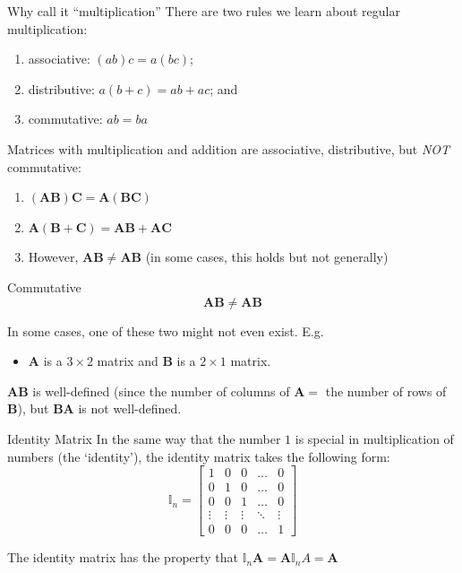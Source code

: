 \documentclass[aspectratio=169,t,11pt,table]{beamer}
\begin{document}
\begin{frame}{Why call it ``multiplication''}
  There are two rules we learn about regular multiplication:
  \begin{enumerate}
    \item associative: $(ab)c = a(bc)$;
    \item distributive: $a (b + c) = ab + ac$; and 
    \item commutative: $ab = ba$
  \end{enumerate} 

  \pause
  \bigskip
  Matrices with multiplication and addition are associative, distributive, but \emph{NOT} commutative:
  \begin{enumerate}
    \item $(\bm{A} \bm{B}) \bm{C} = \bm{A} (\bm{B} \bm{C})$ 
    
    \item $\bm{A} (\bm{B} + \bm{C}) = \bm{A} \bm{B} + \bm{A} \bm{C}$
    
    \item However, $\bm{A} \bm{B} \neq \bm{A} \bm{B}$ (in some cases, this holds but not generally)
  \end{enumerate}
\end{frame}

\begin{frame}{Commutative}
  \vspace*{-\bigskipamount}
  $$\bm{A} \bm{B} \neq \bm{A} \bm{B}$$

  \bigskip
  In some cases, one of these two might not even exist. E.g.
  \begin{itemize}
    \item $\bm{A}$ is a $3 \times 2$ matrix and $\bm{B}$ is a $2 \times 1$ matrix.
  \end{itemize}

  $\bm{A} \bm{B}$ is well-defined (since the number of columns of $\bm{A} =$ the number of rows of $\bm{B}$), but $\bm{B} \bm{A}$ is not well-defined.
\end{frame}

\begin{frame}{Identity Matrix}
  In the same way that the number $1$ is special in multiplication of numbers (the `identity'), the \alert{identity matrix} takes the following form:
  $$
    \mathbb{I}_n = \begin{bmatrix} 
      1 & 0 & 0 & \dots & 0 \\
      0 & 1 & 0 & \dots & 0 \\
      0 & 0 & 1 & \dots & 0 \\
      \vdots & \vdots & \vdots & \ddots & \vdots \\ 
      0 & 0 & 0 & \dots & 1
    \end{bmatrix}
  $$

  \bigskip
  The identity matrix has the property that $\mathbb{I}_n \bm{A} = \bm{A} \mathbb{I}_n A = \bm{A}$
\end{frame}
\end{document}
